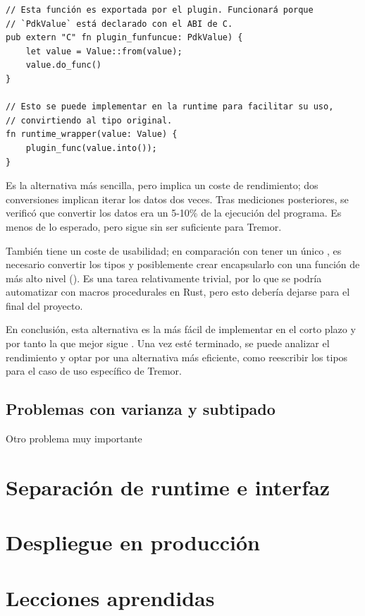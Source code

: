 \begin{verbatim}
// Esta función es exportada por el plugin. Funcionará porque
// `PdkValue` está declarado con el ABI de C.
pub extern "C" fn plugin_funfuncue: PdkValue) {
    let value = Value::from(value);
    value.do_func()
}

// Esto se puede implementar en la runtime para facilitar su uso,
// convirtiendo al tipo original.
fn runtime_wrapper(value: Value) {
    plugin_func(value.into());
}
\end{verbatim}

Es la alternativa más sencilla, pero implica un coste de rendimiento; dos
conversiones implican iterar los datos dos veces. Tras mediciones posteriores,
se verificó que convertir los datos era un 5-10\% de la ejecución del programa.
Es menos de lo esperado, pero sigue sin ser suficiente para Tremor.

También tiene un coste de usabilidad; en comparación con tener un único
, es necesario convertir los tipos y posiblemente crear encapsularlo
con una función de más alto nivel (). Es una tarea
relativamente trivial, por lo que se podría automatizar con macros procedurales
en Rust, pero esto debería dejarse para el final del proyecto.

En conclusión, esta alternativa es la más fácil de implementar en el corto
plazo y por tanto la que mejor sigue \work. Una vez esté terminado, se puede
analizar el rendimiento y optar por una alternativa más eficiente, como
reescribir los tipos para el caso de uso específico de Tremor.

\subsection{Problemas con varianza y subtipado}

Otro problema muy importante 

\section{Separación de runtime e interfaz}

\section{Despliegue en producción}

\section{Lecciones aprendidas}

